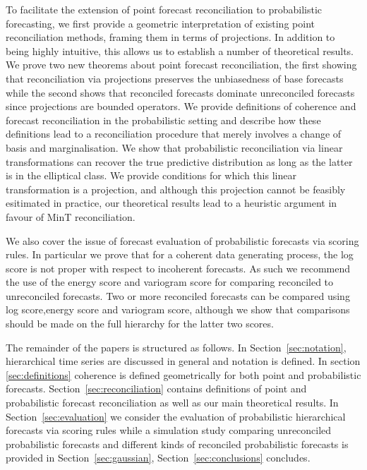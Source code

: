 \documentclass[a4paper, 11pt]{article}
\theoremstyle{theo}
\theoremstyle{definition}
\begin{document}
To facilitate the extension of point forecast reconciliation to probabilistic forecasting, we  first provide a geometric interpretation of existing point reconciliation methods, framing them in terms of projections.  In addition to being highly intuitive, this allows us to establish a number of theoretical results.  We prove two new theorems about point forecast reconciliation, the first showing that reconciliation via projections preserves the unbiasedness of base forecasts while the second shows that reconciled forecasts dominate unreconciled forecasts since projections are bounded operators.  We provide definitions of coherence and forecast reconciliation in the probabilistic setting and describe how these definitions lead to a reconciliation procedure that merely involves a change of basis and marginalisation.  We show that probabilistic reconciliation via linear transformations can recover the true predictive distribution as long as the latter is in the elliptical class.  We provide conditions for which this linear transformation is a projection, and although this projection cannot be feasibly esitimated in practice, our  theoretical results lead to a heuristic argument in favour of MinT reconciliation. 

We also cover the issue of forecast evaluation of probabilistic forecasts via scoring rules.  In particular we prove that for a coherent data generating process, the log score is not proper with respect to incoherent forecasts.  As such we recommend the use of the energy score and variogram score for comparing reconciled to unreconciled forecasts.  Two or more reconciled forecasts can be compared using log score,energy score and  variogram score, although we show that comparisons should be  made on the full hierarchy for the latter two scores.  

The remainder of the papers is  structured as follows.   In Section~\ref{sec:notation}, hierarchical time series are discussed in general and notation is  defined.  In section \ref{sec:definitions} coherence is defined geometrically for both point and probabilistic forecasts.  Section~\ref{sec:reconciliation} contains definitions of point and probabilistic forecast reconciliation as well as our main theoretical results.  In Section~\ref{sec:evaluation} we consider the evaluation of probabilistic hierarchical forecasts via scoring rules while a simulation study comparing unreconciled probabilistic forecasts and different kinds of reconciled probabilistic forecasts is provided in Section~\ref{sec:gaussian},  Section~\ref{sec:conclusions} concludes.
\end{document}
